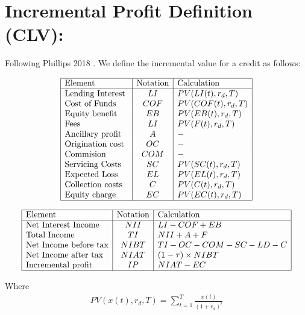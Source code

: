 \section{ Incremental Profit Definition (CLV): }
Following Phillips 2018 \cite{phillips-2018}. We define the incremental value for a credit as follows:

\renewcommand{\arraystretch}{1.5} %
\begin{center} %
\[ %
\begin{array}{|l|c|l|} \hline %
\mbox{Element} & \mbox{Notation} & \mbox{Calculation}\\ \hline
\mbox{Lending Interest }  & LI & PV(LI(t),r_d,T)\\
\mbox{Cost of Funds   }  & COF & PV(COF(t),r_d,T)\\
\mbox{Equity benefit }  & EB & PV(EB(t),r_d,T)\\
\mbox{Fees }  & LI & PV(F(t),r_d,T)\\
\mbox{Ancillary profit }  & A & -\\
\mbox{Origination cost}  & OC & -\\
\mbox{Commision  }  & COM & -\\
\mbox{Servicing Costs}  & SC & PV(SC(t),r_d,T)\\
\mbox{Expected Loss }  & EL & PV(EL(t),r_d,T)\\
\mbox{Collection costs }  & C & PV(C(t),r_d,T)\\
\mbox{Equity charge}  & EC & PV(EC(t),r_d,T)\\

\hline
\end{array} %
\] %
\end{center}

\renewcommand{\arraystretch}{1.5} %
\begin{center} %
\[ %
\begin{array}{|l|c|l|} \hline %
\mbox{Element} & \mbox{Notation} & \mbox{Calculation}\\ \hline
\mbox{Net Interest Income }  & NII & LI-COF+EB\\
\mbox{Total Income  }  & TI & NII+A+F\\
\mbox{Net Income before tax}  & NIBT & TI-OC-COM-SC-LD-C\\
\mbox{Net Income after tax }  & NIAT&(1-\tau)\times NIBT \\
\mbox{Incremental profit  }  & IP & NIAT-EC\\

\hline
\end{array} %
\] %
\end{center}
Where 
\begin{align}
PV(x(t),r_d,T)=\sum_{t=1}^T \frac{x(t)}{(1+r_d)^t}
\end{align}

